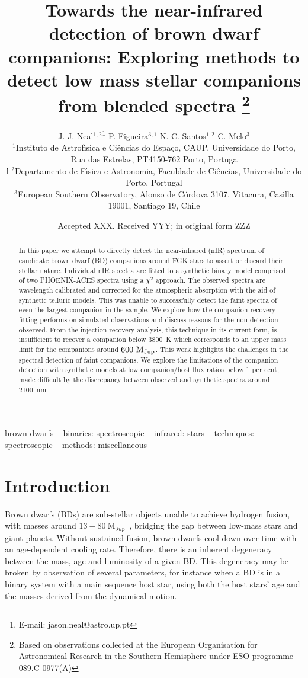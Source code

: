 \documentclass[fleqn,usenatbib]{mnras}
\title[Towards the nIR detection of BD companions]{Towards the near-infrared detection of brown dwarf companions: Exploring methods to detect low mass stellar companions from blended spectra \thanks{Based on observations collected at the European Organisation for Astronomical Research in the Southern Hemisphere under ESO programme 089.C-0977(A)}}
\author[J. J. Neal et al.]{
J. J. Neal$^{1,2}$\thanks{E-mail: jason.neal@astro.up.pt}
P. Figueira$^{3,1}$
N. C. Santos$^{1,2}$
C. Melo$^{3}$
\\
$^{1}$Instituto de Astrof\'{\i}sica e Ci\^encias do Espa\c{c}o, CAUP, Universidade do Porto, Rua das Estrelas, PT4150-762 Porto, Portuga\\l
$^{2}$Departamento de F\'{\i}sica e Astronomia, Faculdade de Ci\^{e}ncias, Universidade do Porto, Portugal\\
$^{3}$European Southern Observatory, Alonso de C\'{o}rdova 3107, Vitacura, Casilla 19001, Santiago 19, Chile\\
}
\date{Accepted XXX. Received YYY; in original form ZZZ}
\newcommand*\bl{\color{blue}}
\begin{document}
\label{firstpage}
\pagerange{\pageref{firstpage}--\pageref{lastpage}}
\maketitle

\begin{abstract}
   {\bl In this paper we attempt to directly detect the near-infrared (nIR) spectrum of candidate brown dwarf (BD) companions around FGK stars to assert or discard their stellar nature. Individual nIR spectra are fitted to a synthetic binary model comprised of two PHOENIX-ACES spectra using a $\chi^2$ approach. The observed spectra are wavelength calibrated and corrected for the atmospheric absorption with the aid of synthetic telluric models. This was unable to successfully detect the faint spectra of even the largest companion in the sample. We explore how the companion recovery fitting performs on simulated observations and discuss reasons for the non-detection observed. From the injection-recovery analysis, this technique in its current form, is insufficient to recover a companion below 3800~K which corresponds to an upper mass limit for the companions around \(\rm 600~M_{Jup}\). This work highlights the challenges in the spectral detection of faint companions. We explore the limitations of the companion detection with synthetic models at low companion/host flux ratios below 1 per cent, made difficult by the discrepancy between observed and synthetic spectra around 2100~nm.}

\end{abstract}

\begin{keywords}
brown dwarfs -- binaries: spectroscopic -- infrared: stars -- techniques: spectroscopic -- methods: miscellaneous
\end{keywords}


\section{Introduction}
\label{sec:intro}
Brown dwarfs (BDs) are sub-stellar objects unable to achieve hydrogen fusion, with masses around \(13-80~\textrm{M}_{Jup}\)~\citep{chabrier_theory_2000}, bridging the gap between low-mass stars and giant planets. Without sustained fusion, brown-dwarfs cool down over time with an age-dependent cooling rate. Therefore, there is an inherent degeneracy between the mass, age and luminosity of a given BD\citep{burrows_nongray_1997}. This degeneracy may be broken by observation of several parameters, for instance when a BD is in a binary system with a main sequence host star, using both the {\bl host stars' age} and the masses derived from the dynamical motion.
\end{document}
